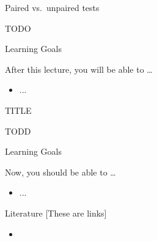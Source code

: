 \begin{frame}[c]{Paired vs.\ unpaired tests}

TODO

\end{frame}
\begin{frame}[c]{Learning Goals}

After this lecture, you will be able to \ldots

\begin{itemize}
  \item ...
\end{itemize}

\end{frame}
\begin{frame}[c]{TITLE}

TODD


\end{frame}

\begin{frame}[c]{Learning Goals}

Now, you should be able to \ldots

\begin{itemize}
  \item ...
\end{itemize}

\end{frame}
\begin{frame}[c]{Literature [These are links]}

\begin{itemize}
	\item {}		
\end{itemize}

\end{frame}
